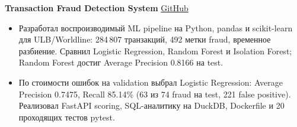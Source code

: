 
\noindent\textbf{Transaction Fraud Detection System}\hfill
\href{https://github.com/Duvi-M/transaction-fraud-detection-system}{GitHub}
\begin{itemize}
  \item Разработал воспроизводимый ML pipeline на Python, pandas и scikit-learn
  для ULB/Worldline: 284\,807 транзакций, 492 метки fraud, временное разбиение.
  Сравнил Logistic Regression, Random Forest и Isolation Forest;
  Random Forest достиг Average Precision 0.8166 на test.
  \item По стоимости ошибок на validation выбрал Logistic Regression:
  Average Precision 0.7475, Recall 85.14\% (63 из 74 fraud на test,
  221 false positive). Реализовал FastAPI scoring, SQL-аналитику на DuckDB,
  Dockerfile и 20 проходящих тестов pytest.
\end{itemize}
